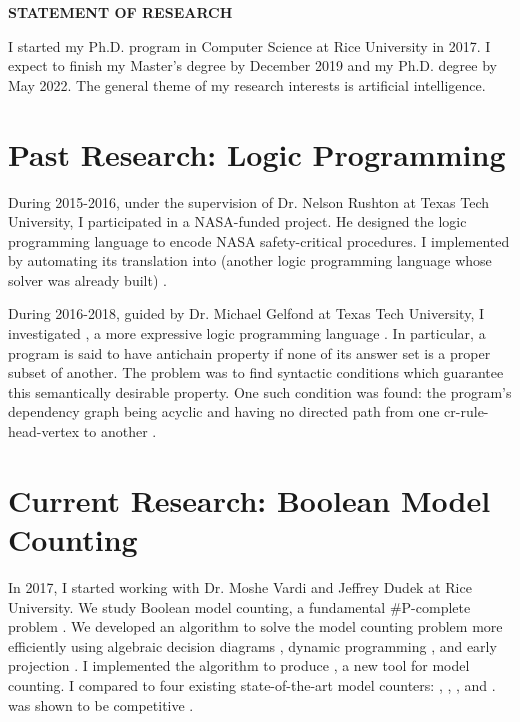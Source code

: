 \documentclass[letterpaper, 12pt]{extarticle}
\begin{document}

\begin{center}
  \textbf{STATEMENT OF RESEARCH} \\
  \vp
\end{center}


I started my Ph.D. program in Computer Science at Rice University in 2017.
I expect to finish my Master's degree by December 2019 and my Ph.D. degree by May 2022.
The general theme of my research interests is artificial intelligence.


\section{Past Research: Logic Programming}

During 2015-2016, under the supervision of Dr. Nelson Rushton at Texas Tech University, I participated in a NASA-funded project.
He designed the logic programming language \llang{} to encode NASA safety-critical procedures.
I implemented \llang{} by automating its translation into \aplong{} (another logic programming language whose solver was already built) \cite{b_aprolog}.

During 2016-2018, guided by Dr. Michael Gelfond at Texas Tech University, I investigated \cplong, a more expressive logic programming language \cite{b_crprolog}.
In particular, a \cp{} program is said to have antichain property if none of its answer set is a proper subset of another.
The problem was to find syntactic conditions which guarantee this semantically desirable property.
One such condition was found: the program's dependency graph being acyclic and having no directed path from one cr-rule-head-vertex to another \cite{phan2018syntactic}.


\section{Current Research: Boolean Model Counting}

In 2017, I started working with Dr. Moshe Vardi and Jeffrey Dudek at Rice University.
We study Boolean model counting, a fundamental \#P-complete problem \cite{valiant79}.
We developed an algorithm to solve the model counting problem more efficiently using algebraic decision diagrams \cite{BFGHMPS97}, dynamic programming \cite{howard66}, and early projection \cite{MPPV04}.
I implemented the algorithm to produce \addmc, a new tool for model counting.
I compared \addmc{} to four existing state-of-the-art model counters: \cachet{} \cite{SBBK04}, \ctd{} \cite{darwiche2004new}, \minictd{} \cite{OD15}, and \df{} \cite{lagniez2017improved}.
\addmc{} was shown to be competitive \cite{addmcAaai}.
\end{document}
